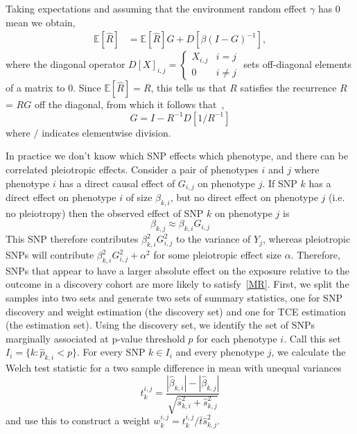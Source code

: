 \documentclass{article}
\begin{document}
Taking expectations and assuming that the environment random effect $\gamma$ has 0 mean we obtain,
\begin{align*}
\mathbb{E}[\hat{R}]  &= \mathbb{E}[\hat{R}] G + D[\beta (I-G)^{-1}],
\end{align*}
where the diagonal operator $D[X]_{i,j} = \left\{ \begin{array}{ll}
  X_{i,j} & i=j \\ 0 & i \neq j \end{array} \right.$ sets off-diagonal elements
  of a matrix to 0.
  Since $\mathbb{E}[\hat{R}] = R$,
this tells us that $R$ satisfies the recurrence
  $R$ = $R G$ off the diagonal, from
  which it follows that~\cite{Pachter},
\begin{equation}\label{r_dce}
G = I - R^{-1} D[1 / R^{-1}]
\end{equation}
where $/$ indicates elementwise division.

In practice we don't know which SNP effects which phenotype,
and there can be correlated pleiotropic effects.
Consider a pair of phenotypes $i$ and $j$ where phenotype $i$ has a direct causal
effect of $G_{i, j}$ on phenotype $j$. If SNP $k$ has a direct effect on phenotype $i$
of size $\beta_{k, i}$, but no direct effect on phenotype $j$ (i.e. no pleiotropy)
then the observed effect of SNP $k$ on phenotype $j$ is
\begin{equation}\label{MR}
\beta_{k,j} \approx \beta_{k,i} G_{i,j}
\end{equation}
This SNP therefore contributes
$\beta_{k, i}^2 G_{i, j}^2$ to the variance of $Y_j$, whereas
pleiotropic SNPs will contribute $\beta_{k, i}^2 G_{i, j}^2 + \alpha^2$
for some pleiotropic effect size $\alpha$. Therefore, SNPs that appear to
have a larger absolute effect on the exposure relative to the outcome in a discovery 
cohort are more likely to satisfy~\eqref{MR}.
First, we split the samples into two sets and generate two sets of summary statistics,
one for SNP discovery and weight estimation (the discovery set) and one for TCE estimation
(the estimation set). Using the discovery set, we identify the set of SNPs marginally
associated at p-value threshold $p$ for each phenotype $i$.
Call this set $I_i = \{k: \hat{p}_{k, i} < p\}$. For every SNP $k \in I_i$ and
every phenotype $j$, we calculate the Welch test statistic for a two sample difference in mean with
unequal variances~\cite{Welch1947}
\begin{equation}
t^{i,j}_k = \frac{|\hat{\beta}_{k, i}| - |\hat{\beta}_{k, j}|}
  {\sqrt{\hat{s}^2_{k, i} + \hat{s}^2_{k, j}}}
\end{equation}
and use this to construct a weight $w^{i, j}_k = t^{i,j}_k/\bar{t} \hat{s}_{k, j}^2$.
  
\end{document}
